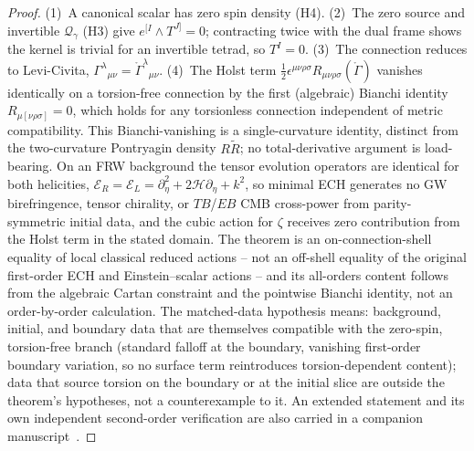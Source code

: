 \documentclass[aps,prd,twocolumn,superscriptaddress,preprintnumbers,nofootinbib,longbibliography,floatfix]{revtex4-2}
\begin{document}
\begin{proof}
(1)~A canonical scalar has zero spin density (H4). (2)~The zero
source and invertible $\mathcal Q_\gamma$ (H3) give $e^{[I}\wedge T^{J]}=0$;
contracting twice with the dual frame shows the kernel is trivial for an
invertible tetrad, so $T^I=0$. (3)~The connection reduces to
Levi-Civita, $\Gamma^\lambda{}_{\mu\nu}=\mathring\Gamma^\lambda{}_{\mu\nu}$.
(4)~The Holst term
$\tfrac12\epsilon^{\mu\nu\rho\sigma}R_{\mu\nu\rho\sigma}(\mathring\Gamma)$
vanishes identically on a torsion-free connection by the first (algebraic)
Bianchi identity $R_{\mu[\nu\rho\sigma]}=0$, which holds for any
torsionless connection independent of metric compatibility. This
Bianchi-vanishing is a single-curvature identity, distinct from the
two-curvature Pontryagin density $R\widetilde R$; no total-derivative
argument is load-bearing. On an FRW background the tensor evolution
operators are identical for both helicities,
$\mathcal E_R=\mathcal E_L=\partial_\eta^2+2\mathcal H\partial_\eta+k^2$,
so minimal ECH generates no GW birefringence, tensor chirality, or
$TB$/$EB$ CMB cross-power from parity-symmetric initial data, and the
cubic action for $\zeta$ receives zero contribution from the Holst term
in the stated domain. The theorem is an on-connection-shell equality of
local classical reduced actions -- not an off-shell equality of the
original first-order ECH and Einstein--scalar actions -- and its
all-orders content follows from the algebraic Cartan constraint and the
pointwise Bianchi identity, not an order-by-order calculation. The
matched-data hypothesis means: background, initial, and boundary data
that are themselves compatible with the zero-spin, torsion-free branch
(standard falloff at the boundary, vanishing first-order boundary
variation, so no surface term reintroduces torsion-dependent content);
data that source torsion on the boundary or at the initial slice are
outside the theorem's hypotheses, not a counterexample to it. An
extended statement and its own independent second-order verification are
also carried in a companion manuscript~\cite{Golden2026P1a}.
\end{proof}
\end{document}
